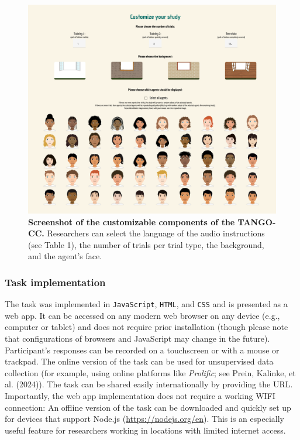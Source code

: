 \documentclass[
  man,floatsintext]{apa7}
\begin{document}
\begin{figure}

{\centering \includegraphics[width=1\linewidth]{../figures/tango-cc-screenshot} 

}

\caption{\textbf{Screenshot of the customizable components of the TANGO-CC.} Researchers can select the language of the audio instructions (see Table 1), the number of trials per trial type, the background, and the agent's face.}\label{fig:fig2}
\end{figure}

\subsubsection{Task implementation}\label{task-implementation}

The task was implemented in \texttt{JavaScript}, \texttt{HTML}, and \texttt{CSS} and is presented as a web app.
It can be accessed on any modern web browser on any device (e.g., computer or tablet) and does not require prior installation (though please note that configurations of browsers and JavaScript may change in the future).
Participant's responses can be recorded on a touchscreen or with a mouse or trackpad.
The online version of the task can be used for unsupervised data collection (for example, using online platforms like \emph{Prolific}; see Prein, Kalinke, et al. (2024)). The task can be shared easily internationally by providing the URL.
Importantly, the web app implementation does not require a working WIFI connection: An offline version of the task can be downloaded and quickly set up for devices that support Node.js (\url{https://nodejs.org/en}).
This is an especially useful feature for researchers working in locations with limited internet access.
\end{document}
